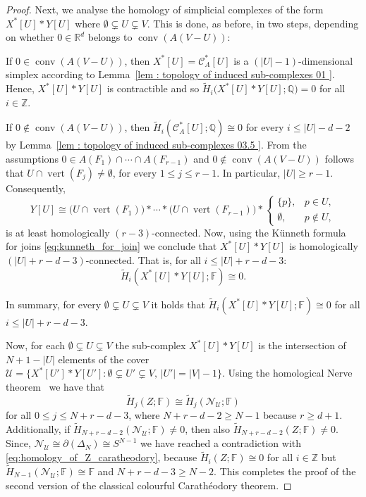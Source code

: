 \documentclass[a4paper,11pt,reqno, english]{amsart}
\theoremstyle{definition}
\theoremstyle{remark}
\newcommand\R{\mathbb R}
\newcommand\Z{\mathbb Z}
\newcommand\Q{\mathbb Q}
\newcommand\FF{\mathbb F}
\newcommand\NN{\mathscr N}
\newcommand\U{\mathscr U}
\newcommand\CC{\mathscr C}
\DeclareMathOperator{\vertex}{\mathrm{vert}}
\DeclareMathOperator{\conv}{\mathrm{conv}}
\begin{document}
\begin{proof}
	\medskip
	Next, we analyse the homology of simplicial complexes of the form $X^*[U]*Y[U]$ where $\emptyset \subsetneq  U \subsetneq  V$.
	This is done, as before, in two steps, depending on whether $0\in\R^d$ belongs to $\conv(A(V-U))$:
	\begin{compactenum}[\quad\rm (1)]
		\item If $0\in\conv(A(V-U))$, then $X^*[U]=\CC_A^*[U]$ is a $(|U|-1)$-dimensional simplex according to Lemma~\ref{lem : topology of induced sub-complexes 01 }. Hence, $X^*[U]*Y[U]$ is contractible and so $\widetilde{H}_{i}\big(X^*[U]*Y[U];\Q\big)=0$ for all $i\in\Z$.
		\item If $0\notin\conv(A(V-U))$, then $\widetilde{H}_i(\CC_A^*[U];\Q)\cong 0$ for every  $i\leq |U|-d-2$  by Lemma~\ref{lem : topology of induced sub-complexes 03.5 }. From the assumptions $
			0\in A(F_1)\cap\cdots\cap A(F_{r-1})
		$ and  $0\notin\conv(A(V-U))$ follows that
		$U \cap  \vertex(F_j)  \neq\emptyset$,
		for every $1\leq j\leq r-1$. In particular, $|U|\geq r-1$.
		Consequently,
		\[
			Y[U]\cong \big( U\cap \vertex({F_1})\big) *\cdots *\big( U\cap \vertex ({F_{r-1}})\big) *
			\begin{cases}
				\{p\},     & p\in U,    \\
				\emptyset, & p\notin U,
			\end{cases}
		\]
		is at least homologically $(r-3)$-connected.
		Now, using the K\"unneth formula for joins \eqref{eq:kunneth_for_join} we conclude that $X^*[U]*Y[U]$ is homologically $(|U|+r-d-3)$-connected.
		That is, for all $i\leq |U|+r-d-3$:
		\[
			\widetilde{H}_i(X^*[U]*Y[U];\FF)\cong 0.
		\]

	\end{compactenum}
	In summary, for every $\emptyset \subsetneq  U \subsetneq  V$ it holds that $\widetilde{H}_i(X^*[U]*Y[U];\FF)\cong 0$ for all $i\leq |U|+r-d-3$.


	\medskip
	Now, for each  $\emptyset \subsetneq  U \subsetneq  V$ the sub-complex $X^*[U]*Y[U]$ is the intersection of $N+1-|U|$ elements of the cover $\U=\{X^*[U']*Y[U'] : \emptyset\subsetneq U' \subsetneq V,\, |U'|=|V|-1\}$.
	Using the homological Nerve theorem~\cite[Thm.\,2.1]{Meshulam2001} we have that
	\[
		\widetilde{H}_{j}(Z;\FF)\cong \widetilde{H}_{j}(\NN_{\U};\FF)
	\]
	for all $0\leq j\leq N+r-d-3$, where $N+r-d-2\geq N-1$ because $r\geq d+1$.
	Additionally, if $\widetilde{H}_{N+r-d-2}(\NN_{\U};\FF)\neq 0$, then also $\widetilde{H}_{N+r-d-2}(Z;\FF)\neq 0$.
	Since, $\NN_{\U}\cong\partial ( \Delta_{N})\cong S^{N-1}$ we have reached a contradiction with \eqref{eq:homology_of_Z_caratheodory}, because $\widetilde{H}_{i}(Z;\FF)\cong 0$ for all $i\in \Z$ but $\widetilde{H}_{N-1}(\NN_{\U};\FF)\cong \FF$ and $N+r-d-3\geq N-2$.
	This completes the proof of the second version of the classical colourful Carath\'eodory theorem.
\end{proof}
\end{document}
